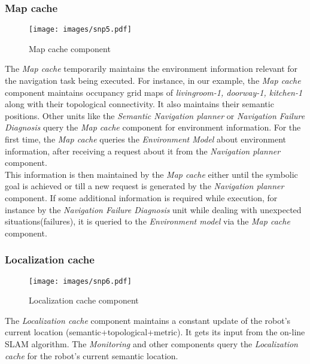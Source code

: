 \subsubsection{Map cache}
\begin{figure}[htbp]
 \centering
 \texttt{[image: images/snp5.pdf]}
 \caption{Map cache component}
 \label{Fig:Data flow summery}
\end{figure}

The \textit{Map cache} temporarily maintains the environment information relevant for the navigation task being executed.
For instance, in our example, the \textit{Map cache} component maintains occupancy grid maps of \textit{livingroom-1, doorway-1, kitchen-1} along with their topological connectivity.
It also maintains their semantic positions.
Other units like the \textit{Semantic Navigation planner} or \textit{Navigation Failure Diagnosis}  query the \textit{Map cache} 
component for environment information. 
For the first time, the \textit{Map cache} queries the \textit{Environment Model} about environment information, after receiving a request about it from the \textit{Navigation planner} component.\\
This information is then maintained by the \textit{Map cache} either until the symbolic goal is achieved or till a new request is generated by the \textit{Navigation planner} component.
If some additional information is required while execution, for instance by the \textit{Navigation Failure Diagnosis} unit while dealing with unexpected situations(failures), 
it is queried to the \textit{Environment model} via the \textit{Map cache} component.

\subsubsection{Localization cache}
\begin{figure}[htbp]
 \centering
 \texttt{[image: images/snp6.pdf]}
 \caption{Localization cache component}
 \label{Fig:Data flow summery}
\end{figure}

The \textit{Localization cache} component maintains a constant update of the robot's current location 
(semantic+topological+metric).
It gets its input from the on-line SLAM algorithm.
The \textit{Monitoring} and other components query the\textit{ Localization cache} for the robot's current semantic location.

